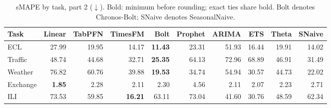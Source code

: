 \begin{table}[!htbp]
\centering
\caption{sMAPE by task, part 2 ($\downarrow$). Bold: minimum before rounding; exact ties share bold. Bolt denotes Chronos-Bolt; SNaive denotes SeasonalNaive.}
\label{tab:smape2}
\small
\setlength{\tabcolsep}{3.5pt}
\begin{tabular}{lrrrrrrrrr}
\hline
Task & Linear & TabPFN & TimesFM & Bolt & Prophet & ARIMA & ETS & Theta & SNaive \\
\hline
ECL & 27.99 & 19.95 & 14.17 & \textbf{11.43} & 23.31 & 51.93 & 16.44 & 19.91 & 14.02 \\
Traffic & 48.74 & 44.68 & 32.71 & \textbf{25.35} & 64.13 & 72.96 & 68.89 & 46.91 & 31.49 \\
Weather & 76.82 & 60.76 & 39.88 & \textbf{19.53} & 34.74 & 54.94 & 30.57 & 44.73 & 22.02 \\
Exchange & \textbf{1.85} & 2.28 & 2.11 & 2.30 & 4.56 & 2.11 & 2.07 & 2.23 & 2.71 \\
ILI & 73.53 & 59.85 & \textbf{16.21} & 63.11 & 73.04 & 41.60 & 30.76 & 48.59 & 62.34 \\
\hline
\end{tabular}
\end{table}
